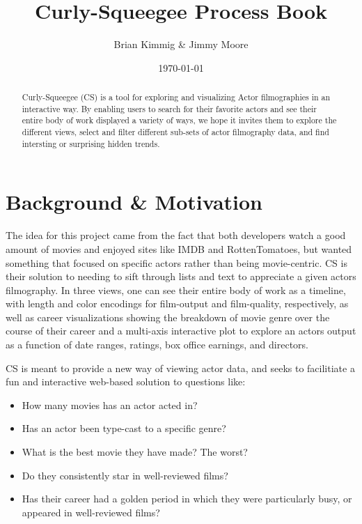 \documentclass[12pt]{article}
\title{Curly-Squeegee Process Book}
\author{ Brian Kimmig \& Jimmy Moore}
\date{\today}
\begin{document}
\maketitle

\begin{abstract}
	Curly-Squeegee (CS) is a tool for exploring and visualizing Actor filmographies in an interactive way. By enabling users to search for their favorite actors and see their entire body of work displayed a variety of ways, we hope it invites them to explore the different views, select and filter different sub-sets of actor filmography data, and find intersting or surprising hidden trends.
\end{abstract}

\tableofcontents

\newpage



\section{Background \& Motivation}
	The idea for this project came from the fact that both developers watch a good amount of movies and enjoyed sites like IMDB and RottenTomatoes, but wanted something that focused on specific actors rather than being movie-centric. CS is their solution to needing to sift through lists and text to appreciate a given actors filmography. In three views, one can see their entire body of work as a timeline, with length and color encodings for film-output and film-quality, respectively, as well as career visualizations showing the breakdown of movie genre over the course of their career and a multi-axis interactive plot to explore an actors output as a function of date ranges, ratings, box office earnings, and directors.
	
	CS is meant to provide a new way of viewing actor data, and seeks to facilitiate a fun and interactive web-based solution to questions like:


	\begin{itemize}
		\item How many movies has an actor acted in?
		\item Has an actor been type-cast to a specific genre?
		\item What is the best movie they have made? The worst?
		\item Do they consistently star in well-reviewed films?
		\item Has their career had a golden period in which they were particularly busy, or appeared in well-reviewed films?
	\end{itemize}
\end{document}
